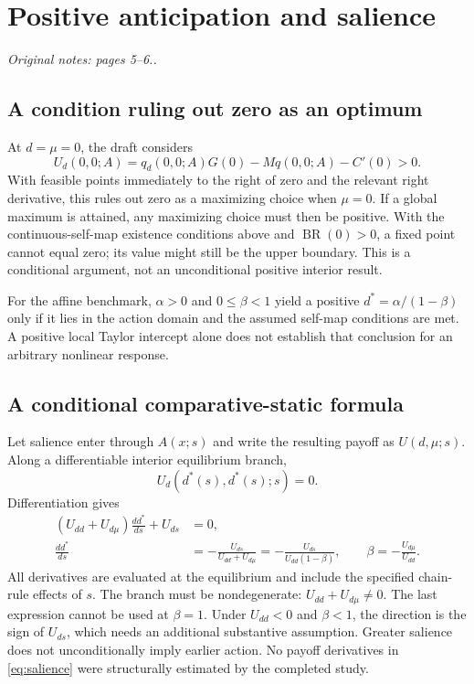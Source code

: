 \documentclass[11pt,a4paper]{article}
\newcommand{\BR}{\operatorname{BR}}
\newcommand{\sourcepage}[1]{\textit{Original notes: #1.}}
\begin{document}
\section{Positive anticipation and salience}
\sourcepage{pages 5--6.}

\subsection{A condition ruling out zero as an optimum}
At $d=\mu=0$, the draft considers
\begin{equation}
 U_d(0,0;A)=q_d(0,0;A)G(0)-Mq(0,0;A)-C'(0)>0.
\end{equation}
With feasible points immediately to the right of zero and the relevant right
derivative, this rules out zero as a maximizing choice when $\mu=0$.
If a global maximum is attained, any maximizing choice must then be positive.
With the continuous-self-map existence conditions above and $\BR(0)>0$,
a fixed point cannot equal zero; its value might still be the upper boundary.
This is a conditional argument, not an unconditional positive interior result.

For the affine benchmark, $\alpha>0$ and $0\leq\beta<1$ yield a positive
$d^*=\alpha/(1-\beta)$ only if it lies in the action domain and the assumed
self-map conditions are met. A positive local Taylor intercept alone does not
establish that conclusion for an arbitrary nonlinear response.

\subsection{A conditional comparative-static formula}
Let salience enter through $A(x;s)$ and write the resulting payoff as
$U(d,\mu;s)$. Along a differentiable interior equilibrium branch,
\[
 U_d(d^*(s),d^*(s);s)=0.
\]
Differentiation gives
\begin{align}
 (U_{dd}+U_{d\mu})\frac{d d^*}{ds}+U_{ds}&=0,\\
 \frac{d d^*}{ds}
 &= -\frac{U_{ds}}{U_{dd}+U_{d\mu}}
  = -\frac{U_{ds}}{U_{dd}(1-\beta)},\qquad
 \beta=-\frac{U_{d\mu}}{U_{dd}}. \label{eq:salience}
\end{align}
All derivatives are evaluated at the equilibrium and include the specified
chain-rule effects of $s$. The branch must be nondegenerate:
$U_{dd}+U_{d\mu}\ne0$. The last expression cannot be used at $\beta=1$.
Under $U_{dd}<0$ and $\beta<1$, the direction is the sign of $U_{ds}$,
which needs an additional substantive assumption. Greater salience does not
unconditionally imply earlier action. No payoff derivatives in
\eqref{eq:salience} were structurally estimated by the completed study.
\end{document}
